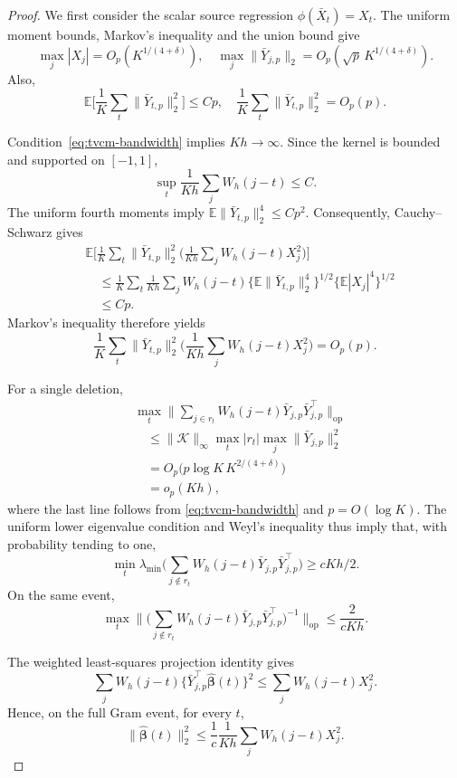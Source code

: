 \documentclass[12pt]{article}
\def\E{\mathbb{E}}
\numberwithin{equation}{section}
\begin{document}
\begin{proof}
We first consider the scalar source regression
$\phi(\bar X_t)=X_t$.
The uniform moment bounds, Markov's inequality and the union
bound give
\[
\max_j|X_j|=O_p(K^{1/(4+\delta)}),
\quad
\max_j\|\bar Y_{j,p}\|_2
=O_p(\sqrt p\,K^{1/(4+\delta)}).
\]
Also,
\[
\E\big[
\frac1K\sum_t\|\bar Y_{t,p}\|_2^2
\big]\leq Cp,
\quad
\frac1K\sum_t\|\bar Y_{t,p}\|_2^2=O_p(p).
\]

Condition~\eqref{eq:tvcm-bandwidth} implies $Kh\to\infty$.
Since the kernel is bounded and supported on $[-1,1]$,
\[
\sup_t\frac1{Kh}\sum_jW_h(j-t)\leq C.
\]
The uniform fourth moments imply
$\E\|\bar Y_{t,p}\|_2^4\leq Cp^2$.
Consequently, Cauchy--Schwarz gives
\begin{align*}
&\E\bigg[
\frac1K\sum_t\|\bar Y_{t,p}\|_2^2
\big(
\frac1{Kh}\sum_jW_h(j-t)X_j^2
\big)
\bigg]\\
&\quad\leq
\frac1K\sum_t\frac1{Kh}\sum_jW_h(j-t)
\{\E\|\bar Y_{t,p}\|_2^4\}^{1/2}
\{\E|X_j|^4\}^{1/2}\\
&\quad\leq Cp.
\end{align*}
Markov's inequality therefore yields
\begin{equation}
\label{eq:tvcm-average-response-bound}
\frac1K\sum_t\|\bar Y_{t,p}\|_2^2
\big(
\frac1{Kh}\sum_jW_h(j-t)X_j^2
\big)
=O_p(p).
\end{equation}

For a single deletion,
\begin{align*}
&\max_t
\Big\|
\sum_{j\in r_t}W_h(j-t)
\bar Y_{j,p}\bar Y_{j,p}^\top
\Big\|_{\mathrm{op}}\\
&\quad\leq
\|\mathcal K\|_\infty
\max_t|r_t|\max_j\|\bar Y_{j,p}\|_2^2\\
&\quad=
O_p\big(p\log K\,K^{2/(4+\delta)}\big)\\
&\quad=o_p(Kh),
\end{align*}
where the last line follows from
\eqref{eq:tvcm-bandwidth} and $p=O(\log K)$.
The uniform lower eigenvalue condition and Weyl's inequality
thus imply that, with probability tending to one,
\[
\min_t
\lambda_{\min}\big(
\sum_{j\notin r_t}W_h(j-t)
\bar Y_{j,p}\bar Y_{j,p}^\top
\big)
\geq cKh/2.
\]
On the same event,
\begin{equation}
\label{eq:tvcm-deleted-inverse}
\max_t
\Big\|
\big(
\sum_{j\notin r_t}W_h(j-t)
\bar Y_{j,p}\bar Y_{j,p}^\top
\big)^{-1}
\Big\|_{\mathrm{op}}
\leq\frac{2}{cKh}.
\end{equation}

The weighted least-squares projection identity gives
\[
\sum_jW_h(j-t)
\{\bar Y_{j,p}^\top\hat{\boldsymbol\beta}(t)\}^2
\leq
\sum_jW_h(j-t)X_j^2.
\]
Hence, on the full Gram event, for every $t$,
\[
\|\hat{\boldsymbol\beta}(t)\|_2^2
\leq
\frac1c\frac1{Kh}\sum_jW_h(j-t)X_j^2.
\]


\end{proof}
\end{document}
